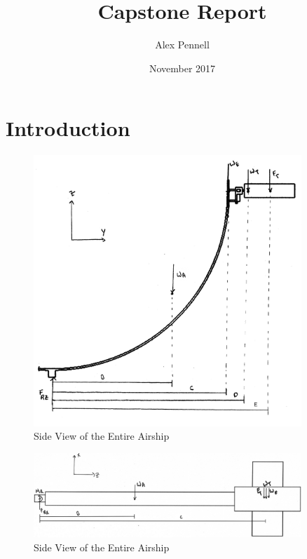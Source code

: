 \documentclass[12pt]{article}
\title{Capstone Report}
\author{Alex Pennell}
\date{November 2017}
\begin{document}
\maketitle

\section{Introduction}

\begin{figure}
	\centering
	\includegraphics[width=0.9\textwidth]{Thruster/ArmThrustDonwards.png}
	\caption{Side View of the Entire Airship}
	\label{fig:FullBlimp}
\end{figure}

\begin{figure}
	\centering
	\includegraphics[width=0.9\textwidth]{Thruster/ArmDown.png}
	\caption{Side View of the Entire Airship}
	\label{fig:FullBlimp}
\end{figure}
\end{document}
